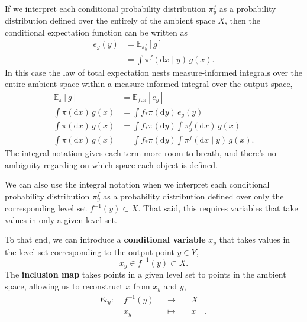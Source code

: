 \documentclass[
  letterpaper,
  DIV=11,
  numbers=noendperiod]{scrartcl}
\begin{document}
If we interpret each conditional probability distribution
\(\pi^{f}_{y}\) as a probability distribution defined over the entirely
of the ambient space \(X\), then the conditional expectation function
can be written as \begin{align*}
e_{g}(y)
&=
\mathbb{E}_{ \pi^{f}_{y} } \! \left[  g  \right]
\\
&=
\int \pi^{f}( \mathrm{d} x \mid y ) \, g(x).
\end{align*} In this case the law of total expectation nests
measure-informed integrals over the entire ambient space within a
measure-informed integral over the output space, \begin{align*}
\mathbb{E}_{\pi} \! \left[ g \right]
&=
\mathbb{E}_{ f_{*} \pi } \! \left[ e_{g} \right]
\\
\int \pi( \mathrm{d} x ) \, g(x)
&=
\int f_{*} \pi (\mathrm{d} y) \, e_{g}(y)
\\
\int \pi( \mathrm{d} x ) \, g(x)
&=
\int f_{*} \pi (\mathrm{d} y)
\int \pi^{f}_{y}( \mathrm{d} x) \, g(x)
\\
\int \pi( \mathrm{d} x ) \, g(x)
&=
\int f_{*} \pi (\mathrm{d} y)
\int \pi^{f}( \mathrm{d} x \mid y ) \, g(x).
\end{align*} The integral notation gives each term more room to breath,
and there's no ambiguity regarding on which space each object is
defined.

We can also use the integral notation when we interpret each conditional
probability distribution \(\pi^{f}_{y}\) as a probability distribution
defined over only the corresponding level set \(f^{-1}(y) \subset X\).
That said, this requires variables that take values in only a given
level set.

To that end, we can introduce a \textbf{conditional variable} \(x_{y}\)
that takes values in the level set corresponding to the output point
\(y \in Y\), \[
x_{y} \in f^{-1}(y) \subset X.
\] The \textbf{inclusion map} takes points in a given level set to
points in the ambient space, allowing us to reconstruct \(x\) from
\(x_{y}\) and \(y\), \begin{alignat*}{6}
\iota_{y} :\; &f^{-1}(y)& &\rightarrow& \; &X&
\\
&x_{y}& &\mapsto& &x&.
\end{alignat*}
\end{document}
